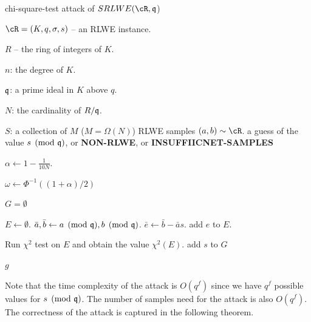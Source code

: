 \documentclass{amsart}
\begin{document}
\begin{algorithm}[H]
\caption{chi-square-test attack of $SRLWE(\cR,\fq$)}          %
\label{IPR}                           %
\begin{algorithmic}[1]              %
     \Require

     $\cR = (K,q,\sigma, s)$ -- an RLWE instance.

     $R$ -- the ring of integers of $K$.

     $n$: the degree of $K$.

     $\mathfrak{q}$: a prime ideal in $K$ above $q$.

     $N$: the cardinality of $R/\mathfrak{q}$.

     $S$: a collection of $M$ ($M = \Omega(N)$) RLWE samples $(a,b) \sim \cR$.
    \Ensure a guess of the value $s \pmod{\mathfrak{q}}$, or {\bf NON-RLWE}, or {\bf INSUFFIICNET-SAMPLES}


    \State $\alpha \gets 1 - \frac{1}{10N}$.

    \State $\omega \gets \Phi^{-1}((1+\alpha)/2)$

    \State $G = \emptyset$

            \State $E \gets \emptyset$.
            \State $\bar{a}, \bar{b} \gets a \pmod{\mathfrak{q}}, b \pmod{\mathfrak{q}}$.
            \State $\bar{e} \gets \bar{b} - \bar{a}s$.
            \State add $e$ to $E$.
        \EndFor

        \State Run $\chi^2$ test on $E$ and obtain the value $\chi^2(E)$.
            \State add $s$ to $G$
        \EndIf
    \EndFor


        \Return $g$
    \Else

    \EndIf

\end{algorithmic}
\end{algorithm}

Note that the time complexity of the attack is $O(q^{f})$ since we have $q^f$ possible values for $s \pmod {\mathfrak{q}}$. The number of samples need for the attack is also $O(q^f)$. The correctness of the attack is captured in the following theorem.
\end{document}
